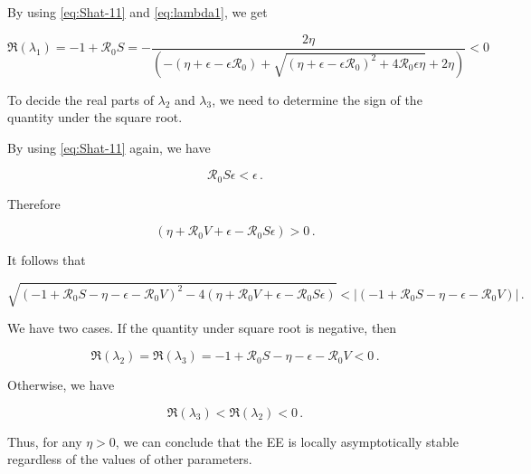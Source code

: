 \documentclass[12pt]{article}
\newcommand{\R}{\mathcal{R}}
\begin{document}
By using \autoref{eq:Shat-11} and \autoref{eq:lambda1}, we get
\begin{linenomath*}
\begin{equation}
\Re(\lambda_1)=-1+\R_0 S=-\frac{2\eta}{(-(\eta+\epsilon-\epsilon\R_0)+\sqrt{(\eta+\epsilon-\epsilon\R_0)^2+4\R_0\epsilon \eta}+2\eta)}<0
\end{equation}
\end{linenomath*}

To decide the real parts of $\lambda_2$ and $\lambda_3$, we need to determine the sign of the quantity under the square root.

By using \autoref{eq:Shat-11} again, we have
\begin{linenomath*}
\begin{equation}
\R_0 S\epsilon<\epsilon\,.
\end{equation}
\end{linenomath*}

Therefore
\begin{linenomath*}
\begin{equation}
(\eta+\R_0 V+\epsilon-\R_0 S\epsilon)>0\,.
\end{equation}
\end{linenomath*}

It follows that
\begin{linenomath*}
\begin{equation}
\sqrt{(-1+\R_0 S-\eta-\epsilon-\R_0 V)^2-4(\eta+\R_0 V+\epsilon-\R_0 S\epsilon)}<|(-1+\R_0 S-\eta-\epsilon-\R_0 V)|\,.
\end{equation}
\end{linenomath*}

We have two cases. If the quantity under square root is negative, then
\begin{linenomath*}
\begin{equation}
\Re(\lambda_2)=\Re(\lambda_3)=-1+\R_0 S-\eta-\epsilon-\R_0 V<0\,.
\end{equation}
\end{linenomath*}

Otherwise, we have
\begin{linenomath*}
\begin{equation}
\Re(\lambda_3)<\Re(\lambda_2)<0\,.
\end{equation}
\end{linenomath*}

Thus, for any $\eta>0$, we can conclude that the EE is locally asymptotically stable regardless of the values of other parameters.
\end{document}
